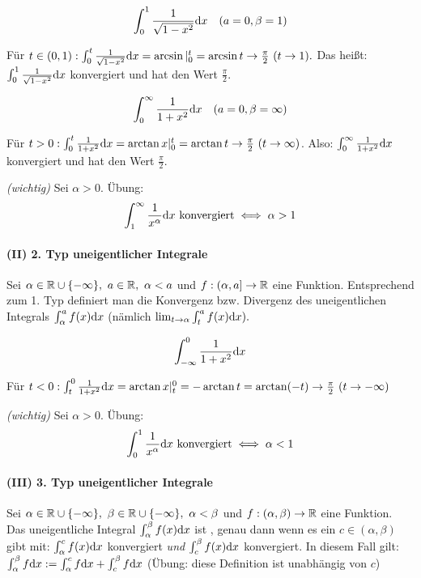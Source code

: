 \documentclass[a4paper,twoside,DIV15,BCOR12mm]{scrbook}
\begin{document}
\begin{beispiele}
\item $$\int_0^1 \frac{1}{\sqrt{1-x^2}}\text{d}x\quad(a=0,\beta=1)$$

Für $t \in (0,1): \int_0^t \frac{1}{\sqrt{1-x^2}}\dx = \arcsin|_0^t = \arcsin t \to \frac{\pi}{2}\ (t \to 1).$ Das heißt: $\int_0^1 \frac{1}{\sqrt{1-x^2}}\text{d}x$ konvergiert und hat den Wert $\frac{\pi}{2}$.

\item $$\int_0^\infty \frac{1}{1+x^2}\text{d}x\quad(a=0,\beta=\infty)$$

Für $t>0: \int_0^t \frac{1}{1+x^2}\text{d}x = \arctan x|_0^t = \arctan t \to \frac{\pi}{2}\ (t \to \infty)$. Also: $\int_0^\infty \frac{1}{1+x^2}\text{d}x$ konvergiert und hat den Wert $\frac{\pi}{2}$.

\item \textit{(wichtig)} Sei $\alpha > 0$. Übung: $$\int_1^\infty \frac{1}{x^\alpha}\text{d}x\text{ konvergiert} \iff \alpha > 1$$
\end{beispiele}

\paragraph{(II) 2. Typ uneigentlicher Integrale}
Sei $\alpha \in \mathbb{R} \cup \{-\infty\},\ a \in \mathbb{R},\ \alpha < a$ und $f:(\alpha,a] \to \mathbb{R}$ eine Funktion. Entsprechend zum 1. Typ definiert man die Konvergenz bzw. Divergenz des uneigentlichen Integrals $\int_\alpha^a f(x) \text{d}x$ (nämlich $\lim_{t\to\alpha} \int_t^a f(x)\text{d}x).$

\begin{beispiele}
\item $$\int_{-\infty}^0 \frac{1}{1+x^2}\text{d}x$$

Für $t<0: \int_t^0 \frac{1}{1+x^2}\text{d}x = \arctan x|_t^0 = -\arctan t = \arctan (-t) \to \frac{\pi}{2}\ (t \to -\infty)$

\item \textit{(wichtig)} Sei $\alpha > 0.$ Übung: $$\int_0^1 \frac{1}{x^\alpha}\text{d}x\text{ konvergiert} \iff \alpha < 1$$
\end{beispiele}

\paragraph{(III) 3. Typ uneigentlicher Integrale}
Sei $\alpha \in \MdR \cup \{-\infty\},\ \beta \in \MdR \cup \{-\infty\},\ \alpha < \beta$ und $f:(\alpha,\beta) \to \mathbb{R}$ eine Funktion. Das uneigentliche Integral $\int_\alpha^\beta f(x)\text{d}x$ ist , genau dann wenn es ein $c \in (\alpha,\beta)$ gibt mit: $\int_\alpha^c f(x)\text{d}x$ konvergiert \emph{und} $\int_c^\beta f(x)\text{d}x$ konvergiert. In diesem Fall gilt: $\int_\alpha^\beta f\text{d}x := \int_\alpha^c f\text{d}x + \int_c^\beta f\text{d}x$ (Übung: diese Definition ist unabhängig von $c$)
\end{document}
